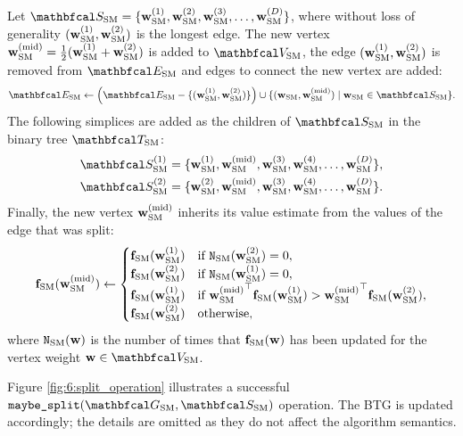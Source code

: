         Let $\SSM=\{\wSMi{1},\wSMi{2},\wSMi{3},\ldots,\wSMi{D}\}$, where without loss of generality $(\wSMi{1},\wSMi{2})$ is the longest edge. The new vertex $\wSMi{\text{mid}}=\frac{1}{2}(\wSMi{1}+\wSMi{2})$ is added to $\VSM$, the edge $(\wSMi{1},\wSMi{2})$ is removed from $\ESM$ and edges to connect the new vertex are added:
        \begin{align}
            \ESM \leftarrow \left(\ESM - \{(\wSMi{1},\wSMi{2})\}\right) \cup \{(\wSM,\wSMi{\text{mid}}) \mid \wSM\in\SSM\}.
        \end{align}
        The following simplices are added as the children of $\SSM$ in the binary tree $\TSM$:
        \begin{align}
            \SSMa{1} = \{\wSMi{1},\wSMi{\text{mid}},\wSMi{3},\wSMi{4},\ldots,\wSMi{D}\}, \\
            \SSMa{2} = \{\wSMi{2},\wSMi{\text{mid}},\wSMi{3},\wSMi{4},\ldots,\wSMi{D}\}.
        \end{align}
        Finally, the new vertex $\wSMi{\text{mid}}$ inherits its value estimate from the values of the edge that was split:
        \begin{align}
            \fSM(\wSMi{\text{mid}}) \leftarrow 
            \begin{cases}
                \fSM(\wSMi{1}) 
                    & \text{if } \NSM(\wSMi{2}) = 0, \\
                \fSM(\wSMi{2})
                    & \text{if } \NSM(\wSMi{1}) = 0, \\
                \fSM(\wSMi{1}) 
                    & \text{if } \wSMi{\text{mid}}^\top \fSM(\wSMi{1}) > \wSMi{\text{mid}}^\top \fSM(\wSMi{2}), \\
                \fSM(\wSMi{2}) & \text{otherwise},
            \end{cases}
            \label{eq:6:sm_split}
        \end{align}
        where $\NSM(\bff{w})$ is the number of times that $\fSM(\bff{w})$ has been updated for the vertex weight $\bff{w}\in\VSM$.

        Figure \ref{fig:6:split_operation} illustrates a successful $\splitsimplex(\GSM,\SSM)$ operation. The BTG is updated accordingly; the details are omitted as they do not affect the algorithm semantics.







